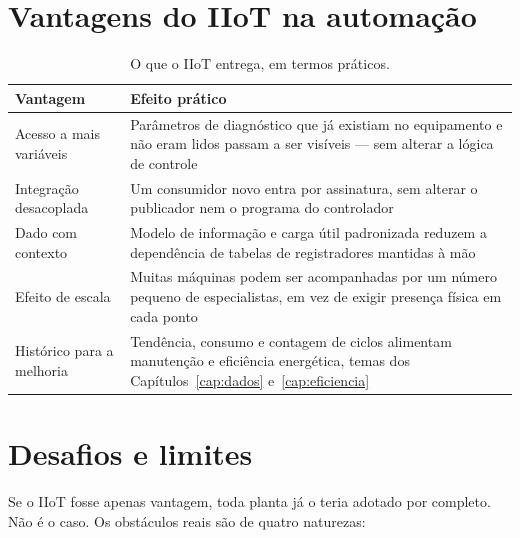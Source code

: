 
\section{Vantagens do IIoT na automação}

\begin{table}[H]
  \centering
  \caption{O que o IIoT entrega, em termos práticos.}
  \label{tab:iiot-vantagens}
  \begin{tabular}{p{4.4cm} p{9.9cm}}
    \toprule
    Vantagem & Efeito prático \\
    \midrule
    Acesso a mais variáveis & Parâmetros de diagnóstico que já existiam no equipamento e não eram
      lidos passam a ser visíveis --- sem alterar a lógica de controle \\
    Integração desacoplada & Um consumidor novo entra por assinatura, sem alterar o publicador nem
      o programa do controlador \\
    Dado com contexto & Modelo de informação e carga útil padronizada reduzem a dependência de
      tabelas de registradores mantidas à mão \\
    Efeito de escala & Muitas máquinas podem ser acompanhadas por um número pequeno de
      especialistas, em vez de exigir presença física em cada ponto \\
    Histórico para a melhoria & Tendência, consumo e contagem de ciclos alimentam manutenção e
      eficiência energética, temas dos Capítulos~\ref{cap:dados} e~\ref{cap:eficiencia} \\
    \bottomrule
  \end{tabular}
\end{table}

\section{Desafios e limites}

Se o IIoT fosse apenas vantagem, toda planta já o teria adotado por completo. Não é o caso. Os
obstáculos reais são de quatro naturezas:

